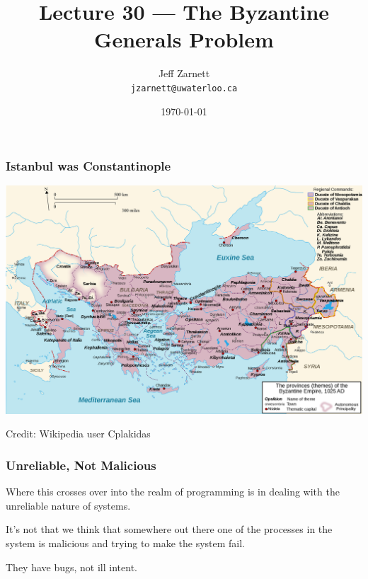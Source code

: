 

\title{Lecture 30 --- The Byzantine Generals Problem }

\author{Jeff Zarnett \\ \small \texttt{jzarnett@uwaterloo.ca}}
\date{\today}




\begin{frame}
  \titlepage

 \end{frame}


\begin{frame}
\frametitle{Istanbul was Constantinople}

\begin{center}
	\includegraphics[width=\textwidth]{images/byzantium}
\end{center}

Credit: Wikipedia user Cplakidas 


\end{frame}

\begin{frame}
\frametitle{Unreliable, Not Malicious}

Where this crosses over into the realm of programming is in dealing with the unreliable nature of systems.

It's not that we think that somewhere out there one of the processes in the system is malicious and trying to make the system fail.

They have bugs, not ill intent.
\end{frame}


